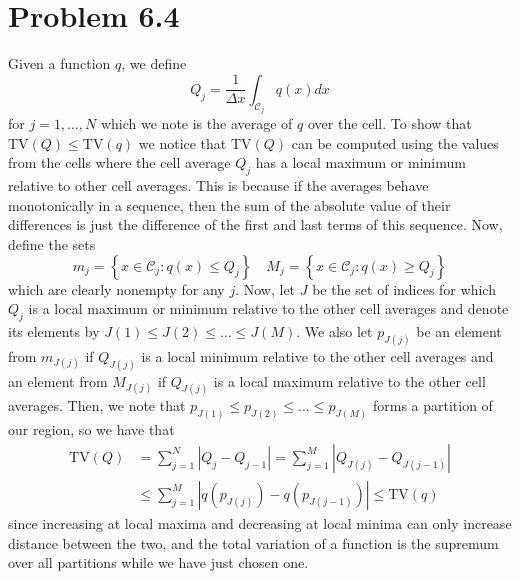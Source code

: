 \documentclass{article}
\begin{document}
\section{Problem 6.4}
Given a function $q$, we define
\[
Q_j=\frac{1}{\Delta x}\int_{\mathcal C_j}q(x)dx
\]
for $j=1,\ldots,N$ which we note is the average  of $q$ over the cell. To show that $\text{TV}(Q)\leq\text{TV}(q)$ we notice that
$\text{TV}(Q)$ can be computed using the values from the cells where the cell average $Q_j$ has a local maximum or minimum relative to other cell averages. This is because if the averages behave monotonically in a sequence, then the sum of the absolute value of their differences is just the difference of the first and last terms of this sequence. Now, define the sets
\[
m_j=\left\{x\in\mathcal C_j:q(x)\leq Q_j\right\}\quad M_j=\left\{x\in\mathcal C_j:q(x)\geq Q_j\right\}
\]
which are clearly nonempty for any $j$. Now, let $J$ be the set of indices for which $Q_j$ is a local maximum or minimum relative to the other cell averages and denote its elements by $J(1)\leq J(2)\leq\ldots\leq J(M)$. We also let $p_{J(j)}$ be an element from $m_{J(j)}$ if $Q_{J(j)}$ is a local minimum relative to the other cell averages and an element from $M_{J(j)}$ if $Q_{J(j)}$ is a local maximum relative to the other cell averages. Then, we note that $p_{J(1)}\leq p_{J(2)}\leq\ldots\leq p_{J(M)}$ forms a partition of our region, so we have that 
\begin{align*}
\text{TV}(Q)&=\sum_{j=1}^{N}|Q_j-Q_{j-1}|=\sum_{j=1}^{M}\left|Q_{J(j)}-Q_{J(j-1)}\right|\\&
\leq\sum_{j=1}^{M}\left|q(p_{J(j)})-q(p_{J(j-1)})\right|\leq\text{TV}(q)
\end{align*}
since increasing at local maxima and decreasing at local minima can only increase distance between the two, and the total variation of a function is the supremum over all partitions while we have just chosen one.
\end{document}
